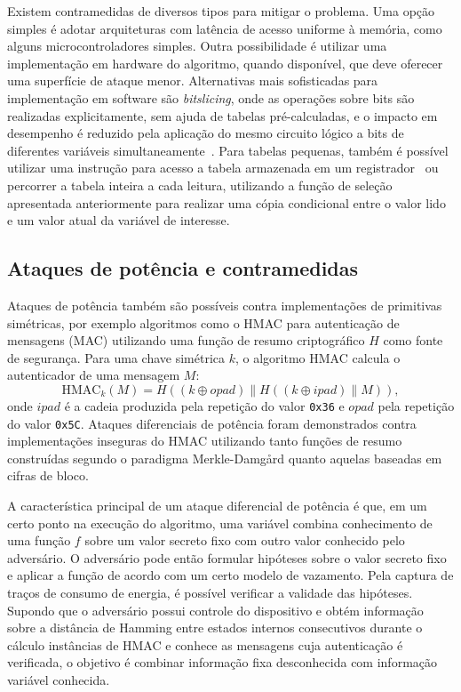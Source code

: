 Existem contramedidas de diversos tipos para mitigar o problema. Uma opção simples é adotar
arquiteturas com latência de acesso uniforme à memória, como alguns microcontroladores simples.
Outra possibilidade é utilizar uma implementação em hardware do algoritmo, quando disponível, que deve oferecer uma superfície de ataque menor.
Alternativas mais sofisticadas para implementação em software são \emph{bitslicing}, onde as operações sobre bits são realizadas explicitamente,
sem ajuda de tabelas pré-calculadas, e o impacto em desempenho é reduzido pela aplicação do mesmo circuito lógico
a bits de diferentes variáveis simultaneamente~\cite{Biham97a,KasperS09}. Para tabelas pequenas, também é possível
utilizar uma instrução para acesso a tabela armazenada em um registrador~\cite{Hamburg09} ou
percorrer a tabela inteira a cada leitura, utilizando a função de seleção apresentada anteriormente
para realizar uma cópia condicional entre o valor lido e um valor atual da variável de interesse.

\subsection{Ataques de potência e contramedidas}

Ataques de potência também são possíveis contra implementações de primitivas simétricas, por exemplo algoritmos como o HMAC para autenticação de mensagens (MAC) utilizando uma função de resumo criptográfico $H$ como fonte de segurança. Para uma chave simétrica $k$, o algoritmo HMAC calcula o autenticador
de uma mensagem $M$:
\[ \text{HMAC}_k(M) = H((k \oplus opad)\parallel H((k \oplus ipad) \parallel M)),\]
onde $ipad$ é a cadeia produzida pela repetição do valor \texttt{0x36} e $opad$ pela repetição do valor \texttt{0x5C}.
Ataques diferenciais de potência foram demonstrados contra implementações inseguras do HMAC utilizando tanto funções de resumo
construídas segundo o paradigma Merkle-Damg\aa rd quanto aquelas baseadas em cifras de bloco.

A característica principal de um ataque diferencial de potência é que, em um certo ponto na execução do algoritmo,
uma variável combina conhecimento de uma função $f$ sobre um valor secreto fixo com outro valor conhecido pelo adversário.
O adversário pode então formular hipóteses sobre o valor secreto fixo e aplicar a função de acordo com um certo modelo de vazamento.
Pela captura de traços de consumo de energia, é possível verificar a validade das hipóteses.
Supondo que o adversário possui controle do dispositivo e obtém informação sobre a distância de Hamming entre estados internos consecutivos
durante o cálculo instâncias de HMAC e conhece as mensagens cuja autenticação é verificada, o objetivo é combinar informação fixa desconhecida
com informação variável conhecida.

